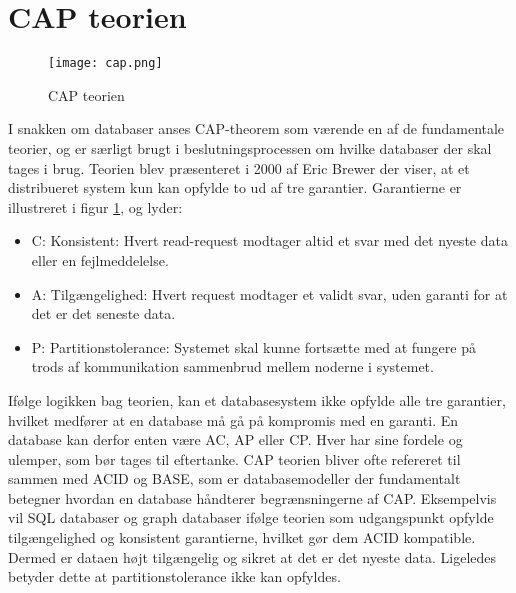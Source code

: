 \section{CAP teorien}
\begin{figure}[H]
    \centering
    \texttt{[image: cap.png]}
    \caption{CAP teorien}
    \label{fig::cap}
\end{figure}

I snakken om databaser anses CAP-theorem som værende en af de fundamentale teorier, og er særligt brugt i beslutningsprocessen om hvilke databaser der skal tages i brug. Teorien blev præsenteret i 2000 af Eric Brewer\cite{capibm} der viser, at et distribueret system kun kan opfylde to ud af tre garantier. Garantierne er illustreret i figur \ref{fig::cap}, og lyder:
\begin{itemize}
    \item C: Konsistent: Hvert read-request modtager altid et svar med det nyeste data eller en fejlmeddelelse.
    \item A: Tilgængelighed: Hvert request modtager et validt svar, uden garanti for at det er det seneste data.
    \item P: Partitionstolerance: Systemet skal kunne fortsætte med at fungere på trods af kommunikation sammenbrud mellem noderne i systemet.
\end{itemize}
Ifølge logikken bag teorien, kan et databasesystem ikke opfylde alle tre garantier, hvilket medfører at en database må gå på kompromis med en garanti. En database kan derfor enten være AC, AP eller CP. Hver har sine fordele og ulemper, som bør tages til eftertanke. CAP teorien bliver ofte refereret til sammen med ACID og BASE, som er databasemodeller der fundamentalt betegner hvordan en database håndterer begrænsningerne af CAP. Eksempelvis vil SQL databaser og graph databaser ifølge teorien som udgangspunkt opfylde tilgængelighed og konsistent garantierne, hvilket gør dem ACID kompatible. Dermed er dataen højt tilgængelig og sikret at det er det nyeste data. Ligeledes betyder dette at partitionstolerance ikke kan opfyldes.
